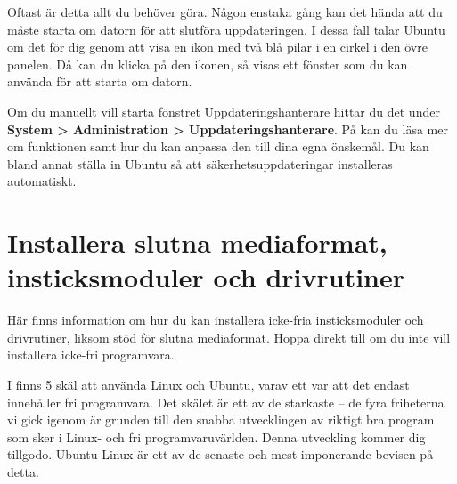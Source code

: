 \documentclass[a4paper,final]{memoir} %
\begin{document}

Oftast är detta allt du behöver göra. Någon enstaka gång kan det hända att du måste starta om datorn för att slutföra uppdateringen. I dessa fall talar Ubuntu om det för dig genom att visa en ikon med två blå pilar i en cirkel i den övre panelen. Då kan du klicka på den ikonen, så visas ett fönster som du kan använda för att starta om datorn.

Om du manuellt vill starta fönstret Uppdateringshanterare hittar du det under \textbf{System \textgreater{} Administration \textgreater{} Uppdateringshanterare}. På  kan du läsa mer om funktionen samt hur du kan anpassa den till dina egna önskemål. Du kan bland annat ställa in Ubuntu så att säkerhetsuppdateringar installeras automatiskt.




\section[Installera slutna mediaformat, insticksmoduler och drivrutiner]{Installera slutna mediaformat, insticks\-moduler och drivrutiner}

Här finns information om hur du kan installera icke-fria insticksmoduler och drivrutiner, liksom stöd för slutna mediaformat. Hoppa direkt till  om du inte vill installera icke-fri programvara.

I  finns 5 skäl att använda Linux och Ubuntu, varav ett var att det endast innehåller fri programvara. Det skälet är ett av de starkaste -- de fyra friheterna vi gick igenom är grunden till den snabba utvecklingen av riktigt bra program som sker i Linux- och fri programvaruvärlden. Denna utveckling kommer dig tillgodo. Ubuntu Linux är ett av de senaste och mest imponerande bevisen på detta. 
\end{document}
